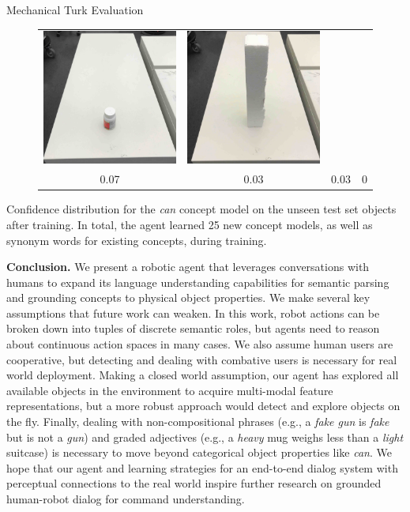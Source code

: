 \documentclass[final]{beamer}
\newcommand{\setblocksize}{\Large \centering}
\newcommand{\paragraphbreak}{\vspace{1cm}}
\begin{document}
\begin{frame}{}
\begin{columns}[t]
\begin{column}{0.24\linewidth}
\begin{block}{\setblocksize Mechanical Turk Evaluation}
{\begin{figure}
\begin{tabular}[t!]{cccc}
  \includegraphics[width=0.22\linewidth]{figures/oidx_6.jpg} &
  \includegraphics[width=0.22\linewidth]{figures/oidx_28.jpg} \\
  0.07 & 0.03 & 0.03 & 0 \\
\end{tabular}
\end{figure}
Confidence distribution for the \emph{can} concept model on the unseen test set objects after training.
In total, the agent learned 25 new concept models, as well as synonym words for existing concepts, during training.
\paragraphbreak

\textbf{Conclusion.} We present a robotic agent that leverages conversations with humans to expand its language understanding capabilities for semantic parsing and grounding concepts to physical object properties.
We make several key assumptions that future work can weaken.
In this work, robot actions can be broken down into tuples of discrete semantic roles, but agents need to reason about continuous action spaces in many cases.
We also assume human users are cooperative, but detecting and dealing with combative users is necessary for real world deployment.
Making a closed world assumption, our agent has explored all available objects in the environment to acquire multi-modal feature representations, but a more robust approach would detect and explore objects on the fly.
Finally, dealing with non-compositional phrases (e.g., a \emph{fake gun} is \emph{fake} but is not a \emph{gun}) and graded adjectives (e.g., a \emph{heavy} mug weighs less than a \emph{light} suitcase) is necessary to move beyond categorical object properties like \emph{can}.
We hope that our agent and learning strategies for an end-to-end dialog system with perceptual connections to the real world inspire further research on grounded human-robot dialog for command understanding.

}
\end{block}

\end{column}	%

\end{columns}

\end{frame}
\end{document}
